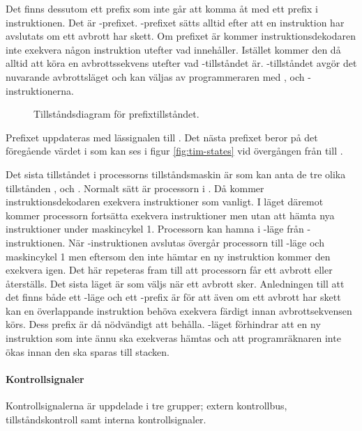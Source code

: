 \documentclass[main.tex]{subfiles}
\begin{document}
Det finns dessutom ett prefix som inte går att komma åt med ett prefix i
instruktionen. Det är -prefixet. -prefixet sätts alltid
efter att en instruktion har avslutats om ett avbrott har skett. Om prefixet är
 kommer instruktionsdekodaren inte exekvera någon instruktion utefter
vad  innehåller. Istället kommer den då alltid att köra en
avbrottssekvens utefter vad -tillståndet är. -tillståndet
avgör det nuvarande avbrottsläget och kan väljas av programmeraren med ,  och -instruktionerna.

\begin{figure}
    \center
    
    \caption{Tillståndsdiagram för prefixtillståndet.}
    \label{fig:prefix}
\end{figure}

Prefixet uppdateras med lässignalen till . Det nästa prefixet beror på
det föregående värdet i  som kan ses i figur \ref{fig:tim-states} vid
övergången från  till .

Det sista tillståndet i processorns tillståndsmaskin är  som kan
anta de tre olika tillstånden ,  och .
Normalt sätt är processorn i . Då kommer instruktionsdekodaren
exekvera instruktioner som vanligt. I läget  däremot kommer
processorn fortsätta exekvera instruktioner men utan att hämta nya
instruktioner under maskincykel 1. Processorn kan hamna i -läge från
-instruktionen. När -instruktionen avslutas övergår
processorn till -läge och maskincykel 1 men eftersom den inte hämtar
en ny instruktion kommer den exekvera  igen. Det här repeteras fram
till att processorn får ett avbrott eller återställs. Det sista läget är
 som väljs när ett avbrott sker. Anledningen till att det finns
både ett -läge och ett -prefix är för att även om ett
avbrott har skett kan en överlappande instruktion behöva exekvera färdigt innan
avbrottsekvensen körs. Dess prefix är då nödvändigt att behålla.
-läget förhindrar att en ny instruktion som inte ännu ska
exekveras hämtas och att programräknaren inte ökas innan den ska sparas till
stacken.

\paragraph{Kontrollsignaler}
Kontrollsignalerna är uppdelade i tre grupper; extern kontrollbus,
tillståndskontroll samt interna kontrollsignaler.
\end{document}
